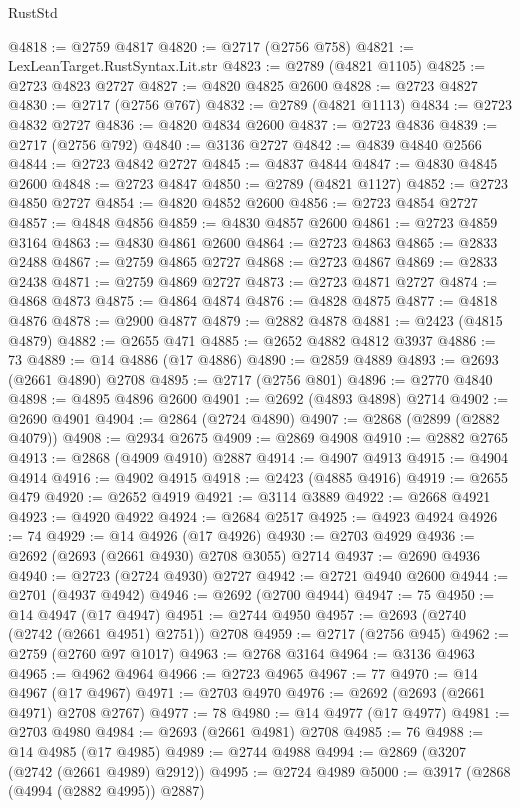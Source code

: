 \begin{lexlean}{RustStd}
\begin{coremodule}
@4818 := @2759 @4817
@4820 := @2717 (@2756 @758)
@4821 := LexLeanTarget.RustSyntax.Lit.str
@4823 := @2789 (@4821 @1105)
@4825 := @2723 @4823 @2727
@4827 := @4820 @4825 @2600
@4828 := @2723 @4827
@4830 := @2717 (@2756 @767)
@4832 := @2789 (@4821 @1113)
@4834 := @2723 @4832 @2727
@4836 := @4820 @4834 @2600
@4837 := @2723 @4836
@4839 := @2717 (@2756 @792)
@4840 := @3136 @2727
@4842 := @4839 @4840 @2566
@4844 := @2723 @4842 @2727
@4845 := @4837 @4844
@4847 := @4830 @4845 @2600
@4848 := @2723 @4847
@4850 := @2789 (@4821 @1127)
@4852 := @2723 @4850 @2727
@4854 := @4820 @4852 @2600
@4856 := @2723 @4854 @2727
@4857 := @4848 @4856
@4859 := @4830 @4857 @2600
@4861 := @2723 @4859 @3164
@4863 := @4830 @4861 @2600
@4864 := @2723 @4863
@4865 := @2833 @2488
@4867 := @2759 @4865 @2727
@4868 := @2723 @4867
@4869 := @2833 @2438
@4871 := @2759 @4869 @2727
@4873 := @2723 @4871 @2727
@4874 := @4868 @4873
@4875 := @4864 @4874
@4876 := @4828 @4875
@4877 := @4818 @4876
@4878 := @2900 @4877
@4879 := @2882 @4878
@4881 := @2423 (@4815 @4879)
@4882 := @2655 @471
@4885 := @2652 @4882 @4812 @3937
@4886 := 73
@4889 := @14 @4886 (@17 @4886)
@4890 := @2859 @4889
@4893 := @2693 (@2661 @4890) @2708
@4895 := @2717 (@2756 @801)
@4896 := @2770 @4840
@4898 := @4895 @4896 @2600
@4901 := @2692 (@4893 @4898) @2714
@4902 := @2690 @4901
@4904 := @2864 (@2724 @4890)
@4907 := @2868 (@2899 (@2882 @4079))
@4908 := @2934 @2675
@4909 := @2869 @4908
@4910 := @2882 @2765
@4913 := @2868 (@4909 @4910) @2887
@4914 := @4907 @4913
@4915 := @4904 @4914
@4916 := @4902 @4915
@4918 := @2423 (@4885 @4916)
@4919 := @2655 @479
@4920 := @2652 @4919
@4921 := @3114 @3889
@4922 := @2668 @4921
@4923 := @4920 @4922
@4924 := @2684 @2517
@4925 := @4923 @4924
@4926 := 74
@4929 := @14 @4926 (@17 @4926)
@4930 := @2703 @4929
@4936 := @2692 (@2693 (@2661 @4930) @2708 @3055) @2714
@4937 := @2690 @4936
@4940 := @2723 (@2724 @4930) @2727
@4942 := @2721 @4940 @2600
@4944 := @2701 (@4937 @4942)
@4946 := @2692 (@2700 @4944)
@4947 := 75
@4950 := @14 @4947 (@17 @4947)
@4951 := @2744 @4950
@4957 := @2693 (@2740 (@2742 (@2661 @4951) @2751)) @2708
@4959 := @2717 (@2756 @945)
@4962 := @2759 (@2760 @97 @1017)
@4963 := @2768 @3164
@4964 := @3136 @4963
@4965 := @4962 @4964
@4966 := @2723 @4965
@4967 := 77
@4970 := @14 @4967 (@17 @4967)
@4971 := @2703 @4970
@4976 := @2692 (@2693 (@2661 @4971) @2708 @2767)
@4977 := 78
@4980 := @14 @4977 (@17 @4977)
@4981 := @2703 @4980
@4984 := @2693 (@2661 @4981) @2708
@4985 := 76
@4988 := @14 @4985 (@17 @4985)
@4989 := @2744 @4988
@4994 := @2869 (@3207 (@2742 (@2661 @4989) @2912))
@4995 := @2724 @4989
@5000 := @3917 (@2868 (@4994 (@2882 @4995)) @2887)

\end{coremodule}
\end{lexlean}
